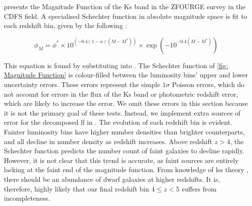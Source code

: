  presents the Magnitude Function of the Ks band in the ZFOURGE \citep{straatman_fourstar_2016} survey in the CDFS field. A specialised Schechter function in absolute magnitude space is fit to each redshift bin, given by the following :

\begin{equation}
    \phi_{M} = \phi^{*}\times 10^{(-0.4(1-\alpha)(M-M^{*}))} \times \exp{(-10^{-0.4(M-M^{*})})}
    \label{EQ: Magnitude Schechter}
\end{equation}

This equation is found by substituting  into . The Schechter function of \cref{fig: Magnitude Function} is colour-filled between the luminosity bins' upper and lower uncertainty errors. These errors represent the simple $1\sigma$ Poisson errors, which do not account for errors in the flux of the Ks band or photometric redshift error, which are likely to increase the error. We omit these errors in this section because it is not the primary goal of these tests. Instead, we implement extra sources of error for the decomposed \gls{lf} in . The evolution of each redshift bin is evident. Fainter luminosity bins have higher number densities than brighter counterparts, and all decline in number density as redshift increases. Above redshift $z>4$, the Schechter function predicts the number count of faint galaxies to decline rapidly. However, it is not clear that this trend is accurate, as faint sources are entirely lacking at the faint end of the magnitude function. From knowledge of \gls{lss} theory \citep{coil_large-scale_2013}, there should be an abundance of dwarf galaxies at higher redshifts. It is, therefore, highly likely that our final redshift bin $4\leq z < 5$ suffers from incompleteness.